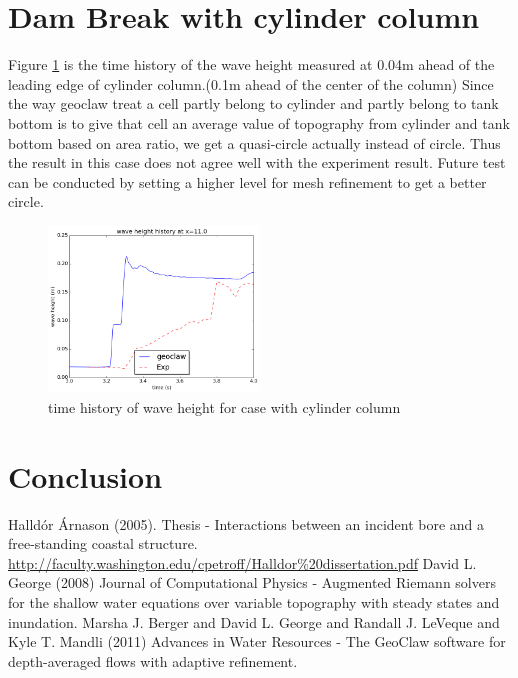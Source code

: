 \documentclass[11pt]{article}
\begin{document}
\section{Dam Break with cylinder column}\label{Sec:Cylinder}
Figure \ref{fig:waveheight_cylinder_x=11.0} is the time history of the wave height measured at 0.04m ahead of the leading edge of cylinder column.(0.1m ahead of the center of the column)
Since the way geoclaw treat a cell partly belong to cylinder and partly belong to tank bottom is to give that cell an average value of topography from cylinder and tank bottom based on area ratio, we get a quasi-circle actually instead of circle. Thus the result in this case does not agree well with the experiment result. 
Future test can be conducted by setting a higher level for mesh refinement to get a better circle.
\begin{figure}[h!]
    \centering
    \includegraphics[width=0.5\textwidth]{./plots/waveheight_cylinder_x11}
    \caption{time history of wave height for case with cylinder column}
    \label{fig:waveheight_cylinder_x=11.0}
\end{figure}

\section{Conclusion}\label{Sec:Conclusion}
{\footnotesize
\begin{thebibliography}{100}
 Halld\'or \'Arnason  (2005). Thesis - Interactions between an incident bore and a free-standing coastal structure. \url{http://faculty.washington.edu/cpetroff/Halldor%20dissertation.pdf}
 David L. George (2008) Journal of Computational Physics - Augmented Riemann solvers for the shallow water equations over variable topography with steady states and inundation.
 Marsha J. Berger and David L. George and Randall J. LeVeque and Kyle T. Mandli (2011) Advances in Water Resources - The GeoClaw software for depth-averaged flows with adaptive refinement.
\end{thebibliography}
}
\end{document}
